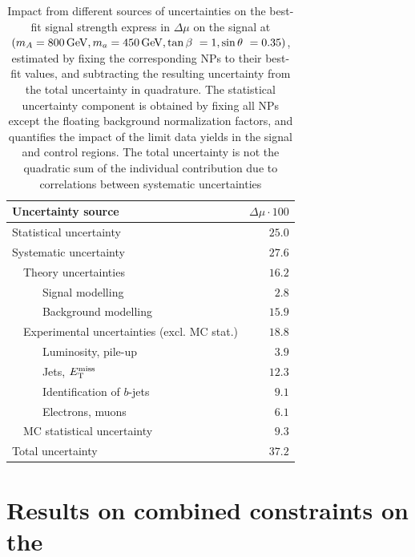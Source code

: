 \begin{table}
    \centering
    \begin{tabular}{lllr}
    \hline\hline
        \multicolumn{3}{l}{Uncertainty source} & $\Delta\mu\cdot 100$\\
        \hline
        \multicolumn{3}{l}{Statistical uncertainty}  & $25.0$ \\
        \hline
         \multicolumn{3}{l}{Systematic uncertainty}  & $27.6$ \\
         &  \multicolumn{2}{l}{Theory uncertainties}  &  $16.2$\\
         & & Signal modelling & $2.8$ \\
         & & Background modelling & $15.9$ \\
         & \multicolumn{2}{l}{Experimental uncertainties (excl. MC stat.)} & $18.8$ \\
         & & Luminosity, pile-up & $3.9$ \\ 
         & & Jets, $E_{\mathrm{T}}^{\mathrm{miss}}$ & $12.3$ \\
         & & Identification of $b$-jets & $9.1$ \\
         & & Electrons, muons & $6.1$ \\
         & \multicolumn{2}{l}{MC statistical uncertainty} & $9.3$ \\
         \hline
         \multicolumn{3}{l}{Total uncertainty} & $37.2$ \\
    \hline\hline
    \end{tabular}
    \caption{Impact from different sources of uncertainties on the best-fit signal strength express in $\Delta\mu$ on the signal at $(m_A=800\, \mathrm{GeV}, m_a=450 \, \mathrm{GeV}, \tan\beta~=1, \sin\theta~=0.35)$, estimated by fixing the corresponding NPs to their best-fit values, and subtracting the resulting uncertainty from the total uncertainty in quadrature. The statistical uncertainty component is obtained by fixing all NPs except the floating background normalization factors, and quantifies the impact of the limit data yields in the signal and control regions. The total uncertainty is not the quadratic sum of the individual contribution due to correlations between systematic uncertainties }
    \label{tab:uncertainty-contribution}
\end{table}

\section{Results on combined constraints on the \thdma}

